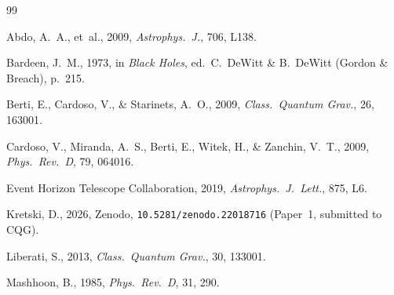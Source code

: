 \documentclass[12pt,a4paper]{article}
\begin{document}

\begin{thebibliography}{99}

Abdo, A.~A., et~al., 2009, \textit{Astrophys.\ J.}, 706, L138.

Bardeen, J.~M., 1973, in \textit{Black Holes}, ed.\ C.~DeWitt \&
B.~DeWitt (Gordon \& Breach), p.~215.

Berti, E., Cardoso, V., \& Starinets, A.~O., 2009,
\textit{Class.\ Quantum Grav.}, 26, 163001.

Cardoso, V., Miranda, A.~S., Berti, E., Witek, H., \& Zanchin, V.~T.,
2009, \textit{Phys.\ Rev.\ D}, 79, 064016.

Event Horizon Telescope Collaboration, 2019,
\textit{Astrophys.\ J.\ Lett.}, 875, L6.

Kretski, D., 2026, Zenodo, \texttt{10.5281/zenodo.22018716}
(Paper~1, submitted to CQG).

Liberati, S., 2013, \textit{Class.\ Quantum Grav.}, 30, 133001.

Mashhoon, B., 1985, \textit{Phys.\ Rev.\ D}, 31, 290.

\end{thebibliography}
\end{document}
